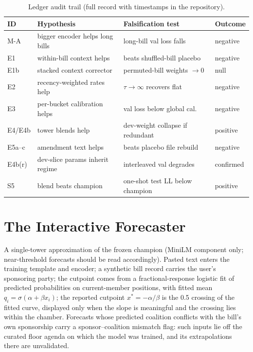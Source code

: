 \documentclass[12pt]{article}
\begin{document}
\begin{table}[h]
\centering
\caption{Ledger audit trail (full record with timestamps in the
repository).}
\label{tab:ledger}
{\small
\begin{tabular}{llll}
\toprule
ID & Hypothesis & Falsification test & Outcome \\
\midrule
M-A & bigger encoder helps long bills & long-bill val loss falls & negative \\
E1 & within-bill context helps & beats shuffled-bill placebo & negative \\
E1b & stacked context corrector & permuted-bill weights $\to 0$ & null \\
E2 & recency-weighted rates help & $\tau\to\infty$ recovers flat & negative \\
E3 & per-bucket calibration helps & val loss below global cal. & negative \\
E4/E4b & tower blends help & dev-weight collapse if redundant & positive \\
E5a--c & amendment text helps & beats placebo file rebuild & negative \\
E4b(r) & dev-slice params inherit regime & interleaved val degrades & confirmed \\
S5 & blend beats champion & one-shot test LL below champion & positive \\
\bottomrule
\end{tabular}}
\end{table}

\section{The Interactive Forecaster}
\label{app:dashboard}

A single-tower approximation of the frozen champion (MiniLM component
only; near-threshold forecasts should be read accordingly). Pasted
text enters the training template and encoder; a synthetic bill
record carries the user's sponsoring party; the cutpoint comes from a
fractional-response logistic fit of predicted probabilities on
current-member positions, with fitted mean $q_i =
\sigma(\alpha + \beta x_i)$; the reported cutpoint $x^* =
-\alpha/\beta$ is the 0.5 crossing of the fitted curve, displayed
only when the slope is meaningful and the crossing lies within the
chamber. Forecasts whose predicted coalition conflicts with the
bill's own sponsorship carry a sponsor--coalition mismatch flag: such
inputs lie off the curated floor agenda on which the model was
trained, and its extrapolations there are unvalidated.
\end{document}

